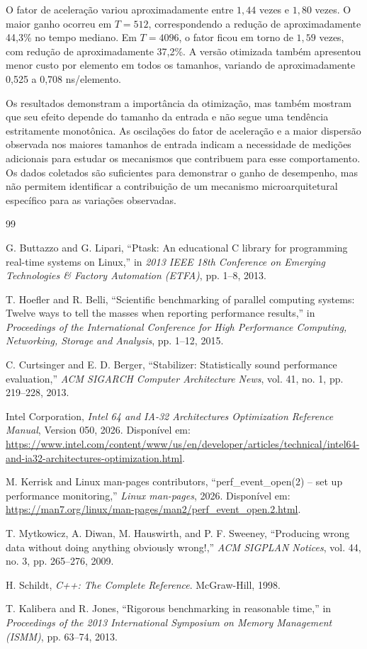 \documentclass[11pt,a4paper]{article}
\begin{document}
O fator de aceleração variou aproximadamente entre $1{,}44$ vezes e $1{,}80$ vezes. O maior ganho ocorreu em $T=512$, correspondendo a redução de aproximadamente 44,3\% no tempo mediano. Em $T=4096$, o fator ficou em torno de $1{,}59$ vezes, com redução de aproximadamente 37,2\%. A versão otimizada também apresentou menor custo por elemento em todos os tamanhos, variando de aproximadamente 0,525 a 0,708 ns/elemento.

Os resultados demonstram a importância da otimização, mas também mostram que seu efeito depende do tamanho da entrada e não segue uma tendência estritamente monotônica. As oscilações do fator de aceleração e a maior dispersão observada nos maiores tamanhos de entrada indicam a necessidade de medições adicionais para estudar os mecanismos que contribuem para esse comportamento. Os dados coletados são suficientes para demonstrar o ganho de desempenho, mas não permitem identificar a contribuição de um mecanismo microarquitetural específico para as variações observadas.


\begin{thebibliography}{99}

G. Buttazzo and G. Lipari,
``Ptask: An educational C library for programming real-time systems on Linux,''
in \emph{2013 IEEE 18th Conference on Emerging Technologies \& Factory Automation (ETFA)},
pp. 1--8, 2013.

T. Hoefler and R. Belli,
``Scientific benchmarking of parallel computing systems: Twelve ways to tell the masses when reporting performance results,''
in \emph{Proceedings of the International Conference for High Performance Computing, Networking, Storage and Analysis},
pp. 1--12, 2015.

C. Curtsinger and E. D. Berger,
``Stabilizer: Statistically sound performance evaluation,''
\emph{ACM SIGARCH Computer Architecture News},
vol. 41, no. 1, pp. 219--228, 2013.

Intel Corporation,
\emph{Intel 64 and IA-32 Architectures Optimization Reference Manual}, Version 050, 2026.
Disponível em: \url{https://www.intel.com/content/www/us/en/developer/articles/technical/intel64-and-ia32-architectures-optimization.html}.

M. Kerrisk and Linux man-pages contributors,
``perf\_event\_open(2) -- set up performance monitoring,'' \emph{Linux man-pages}, 2026.
Disponível em: \url{https://man7.org/linux/man-pages/man2/perf_event_open.2.html}.

T. Mytkowicz, A. Diwan, M. Hauswirth, and P. F. Sweeney,
``Producing wrong data without doing anything obviously wrong!,''
\emph{ACM SIGPLAN Notices},
vol. 44, no. 3, pp. 265--276, 2009.

H. Schildt,
\emph{C++: The Complete Reference}.
McGraw-Hill, 1998.

T. Kalibera and R. Jones,
``Rigorous benchmarking in reasonable time,''
in \emph{Proceedings of the 2013 International Symposium on Memory Management (ISMM)},
pp. 63--74, 2013.

\end{thebibliography}
\end{document}
